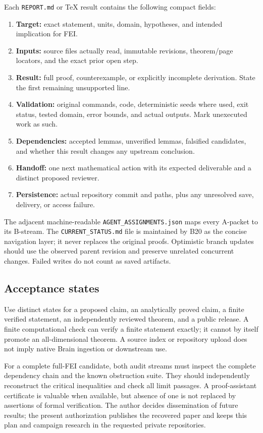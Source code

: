 \documentclass[11pt]{article}
\begin{document}
Each \texttt{REPORT.md} or TeX result contains the following compact fields:
\begin{enumerate}
\item \textbf{Target:} exact statement, units, domain, hypotheses, and intended implication for FEI.
\item \textbf{Inputs:} source files actually read, immutable revisions, theorem/page locators, and the exact prior open step.
\item \textbf{Result:} full proof, counterexample, or explicitly incomplete derivation. State the first remaining unsupported line.
\item \textbf{Validation:} original commands, code, deterministic seeds where used, exit status, tested domain, error bounds, and actual outputs. Mark unexecuted work as such.
\item \textbf{Dependencies:} accepted lemmas, unverified lemmas, falsified candidates, and whether this result changes any upstream conclusion.
\item \textbf{Handoff:} one next mathematical action with its expected deliverable and a distinct proposed reviewer.
\item \textbf{Persistence:} actual repository commit and paths, plus any unresolved save, delivery, or access failure.
\end{enumerate}

The adjacent machine-readable \texttt{AGENT\_ASSIGNMENTS.json} maps every A-packet to its B-stream. The \texttt{CURRENT\_STATUS.md} file is maintained by B20 as the concise navigation layer; it never replaces the original proofs. Optimistic branch updates should use the observed parent revision and preserve unrelated concurrent changes. Failed writes do not count as saved artifacts.

\subsection{Acceptance states}

Use distinct states for a proposed claim, an analytically proved claim, a finite verified statement, an independently reviewed theorem, and a public release. A finite computational check can verify a finite statement exactly; it cannot by itself promote an all-dimensional theorem. A source index or repository upload does not imply native Brain ingestion or downstream use.

For a complete full-FEI candidate, both audit streams must inspect the complete dependency chain and the known obstruction suite. They should independently reconstruct the critical inequalities and check all limit passages. A proof-assistant certificate is valuable when available, but absence of one is not replaced by assertions of formal verification. The author decides dissemination of future results; the present authorization publishes the recovered paper and keeps this plan and campaign research in the requested private repositories.
\end{document}
